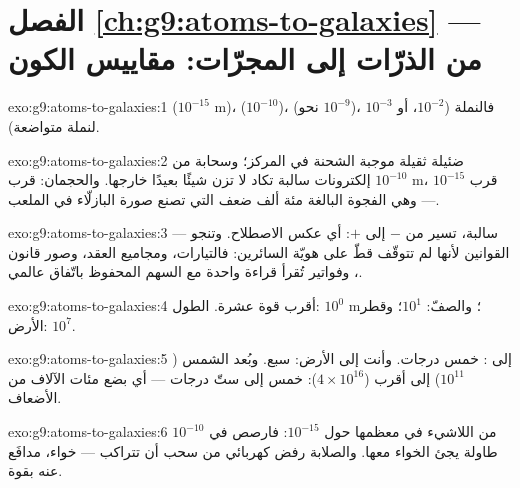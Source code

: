 \section*{الفصل \ref{ch:g9:atoms-to-galaxies} --- من الذرّات إلى المجرّات: مقاييس الكون}

\begin{solution}{exo:g9:atoms-to-galaxies:1}
 ($10^{-15}$ \unit{m})،  ($10^{-10}$)، 
(نحو $10^{-9}$)، فالنملة ($10^{-2}$، أو $10^{-3}$ لنملة
متواضعة).
\end{solution}

\begin{solution}{exo:g9:atoms-to-galaxies:2}
 ضئيلة ثقيلة موجبة الشحنة في المركز؛ وسحابة من إلكترونات
سالبة تكاد لا تزن شيئًا بعيدًا خارجها. والحجمان:  قرب
$10^{-10}$ \unit{m}،  قرب $10^{-15}$ --- وهي الفجوة
البالغة مئة ألف ضعف التي تصنع صورة البازلّاء في الملعب.
\end{solution}

\begin{solution}{exo:g9:atoms-to-galaxies:3}
 --- سالبة، تسير من $-$ إلى $+$: أي عكس الاصطلاح.
وتنجو القوانين لأنها لم تتوقّف قطّ على هويّة السائرين:
فالتيارات، ومجاميع العقد، وصور قانون ، وفواتير 
تُقرأ قراءة واحدة مع السهم المحفوظ باتّفاق عالمي.
\end{solution}

\begin{solution}{exo:g9:atoms-to-galaxies:4}
أقرب قوة عشرة. الطول: $10^{0}$ \unit{m}؛ والصفّ: $10^{1}$؛
وقطر الأرض: $10^{7}$.
\end{solution}

\begin{solution}{exo:g9:atoms-to-galaxies:5}
 إلى : خمس درجات. وأنت إلى الأرض: سبع. وبُعد الشمس
($10^{11}$) إلى أقرب  ($4 \times 10^{16}$): خمس إلى ستّ
درجات --- أي بضع مئات الآلاف من الأضعاف.
\end{solution}

\begin{solution}{exo:g9:atoms-to-galaxies:6}
 $10^{-10}$  من اللاشيء في معظمها حول 
$10^{-15}$: فارصص  في طاولة يجئ الخواء معها. والصلابة
رفض كهربائي من سحب  أن تتراكب --- خواء، مدافَع عنه
بقوة.
\end{solution}

